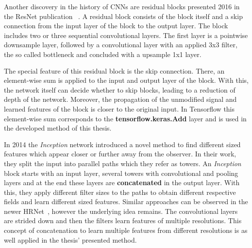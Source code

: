 Another discovery in the history of \glspl{CNN} are residual blocks presented 2016 in the ResNet publication ~\cite{resnet}.
A residual block consists of the block itself and a skip connection from the input layer of the block to the output layer.
The block includes two or three sequential convolutional layers. The first layer is a pointwise downsample layer,
followed by a convolutional layer with an applied 3x3 filter, the so called bottleneck and concluded with a upsample 1x1 layer.

The special feature of this residual block is the skip connection.
There, an element-wise sum is applied to the input and
output layer of the block.
With this, the network itself can decide whether to skip blocks, leading to a reduction of depth of the network.
Moreover, the propagation of the unmodified signal and learned features
of the block is closer to the original input.
In Tensorflow this element-wise sum corresponds to the \textbf{tensorflow.keras.Add} layer and is used in the developed
method of this thesis.

In 2014 the \textit{Inception} network introduced a novel method to find different sized features which appear closer or
further away from the observer.
In their work, they split the input into parallel paths which they refer as towers.
An \textit{Inception} block starts with an input layer, several towers with convolutional and pooling layers and at the end
these layers are \textbf{concatenated} in the output layer.
With this, they apply different filter sizes to the paths to obtain different respective fields and learn different sized features.
Similar approaches can be observed in the newer HRNet~\cite{HRNetv2}, however the underlying idea remains.
The convolutional layers are strided down and then the filters learn features of multiple resolutions.
This concept of concatenation to learn multiple features from different resolutions is as well applied in the thesis'
presented method.

